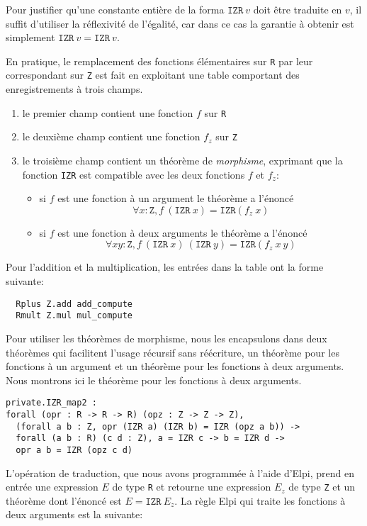\documentclass{jflart}
\begin{document}
Pour justifier qu'une constante entière de la forma \(\texttt{IZR}~v\)
doit être traduite en \(v\), il suffit d'utiliser la réflexivité de
l'égalité, car dans ce cas la garantie à obtenir est simplement
\(\texttt{IZR}~v = \texttt{IZR}~v\).

En pratique, le remplacement des fonctions élémentaires sur \texttt{R} par
leur correspondant sur \texttt{Z} est fait en exploitant une table
comportant des enregistrements à trois champs.
\begin{enumerate}
\item le premier champ contient une fonction \(f\) sur \texttt{R}
\item le deuxième champ contient une fonction \(f_z\) sur \texttt{Z}
\item le troisième champ contient un théorème de {\em morphisme},
  exprimant que la fonction \texttt{IZR} est compatible avec les deux
  fonctions \(f\) et \(f_z\):
\begin{itemize}
\item si \(f\) est une fonction à un argument le théorème a l'énoncé
\[\forall x : \texttt{Z}, f~(\texttt{IZR}~x)=\texttt{IZR}(f_z~x)\]
\item si \(f\) est une fonction à deux arguments le théorème a l'énoncé
\[\forall x y : \texttt{Z}, f~(\texttt{IZR}~x)~(\texttt{IZR}~y)=\texttt{IZR}(f_z~x~y)\]
\end{itemize}
\end{enumerate}

Pour l'addition et la multiplication, les entrées dans la table ont
 la forme suivante:
\begin{verbatim}
  Rplus Z.add add_compute
  Rmult Z.mul mul_compute
\end{verbatim}

Pour utiliser les théorèmes de morphisme, nous les encapsulons dans deux
théorèmes qui facilitent l'usage récursif sans réécriture, un théorème
pour les fonctions à un argument et un théorème pour les fonctions à deux
arguments.  Nous montrons ici le théorème pour les fonctions à deux arguments.

\begin{verbatim}
private.IZR_map2 :
forall (opr : R -> R -> R) (opz : Z -> Z -> Z),
  (forall a b : Z, opr (IZR a) (IZR b) = IZR (opz a b)) ->
  forall (a b : R) (c d : Z), a = IZR c -> b = IZR d ->
  opr a b = IZR (opz c d)
\end{verbatim}

L'opération de traduction, que nous avons programmée à l'aide d'Elpi,
prend en entrée une expression \(E\) de type \texttt{R} et retourne une
expression \(E_z\) de type \texttt{Z} et un théorème dont l'énoncé est
\(E = \texttt{IZR}~E_z\).  La règle Elpi qui traite les fonctions à deux
arguments est la suivante:
\end{document}
